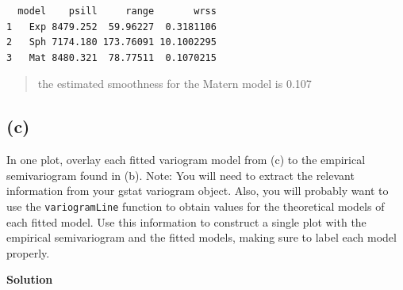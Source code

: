 \documentclass[
  letterpaper,
  DIV=11,
  numbers=noendperiod]{scrartcl}
\newenvironment{Shaded}{\begin{snugshade}}{\end{snugshade}}
\newcommand{\CommentTok}[1]{\textcolor[rgb]{0.37,0.37,0.37}{#1}}
\newcommand{\DecValTok}[1]{\textcolor[rgb]{0.68,0.00,0.00}{#1}}
\newcommand{\FunctionTok}[1]{\textcolor[rgb]{0.28,0.35,0.67}{#1}}
\newcommand{\NormalTok}[1]{\textcolor[rgb]{0.00,0.23,0.31}{#1}}
\newcommand{\OtherTok}[1]{\textcolor[rgb]{0.00,0.23,0.31}{#1}}
\newcommand{\StringTok}[1]{\textcolor[rgb]{0.13,0.47,0.30}{#1}}
\begin{document}
\begin{Shaded}
\end{Shaded}

\begin{verbatim}
  model    psill     range       wrss
1   Exp 8479.252  59.96227  0.3181106
2   Sph 7174.180 173.76091 10.1002295
3   Mat 8480.321  78.77511  0.1070215
\end{verbatim}

\begin{quote}
the estimated smoothness for the Matern model is 0.107
\end{quote}

\hypertarget{c}{%
\subsection{(c)}\label{c}}

In one plot, overlay each fitted variogram model from (c) to the
empirical semivariogram found in (b). Note: You will need to extract the
relevant information from your gstat variogram object. Also, you will
probably want to use the \texttt{variogramLine} function to obtain
values for the theoretical models of each fitted model. Use this
information to construct a single plot with the empirical semivariogram
and the fitted models, making sure to label each model properly.

\textbf{Solution}
\end{document}
